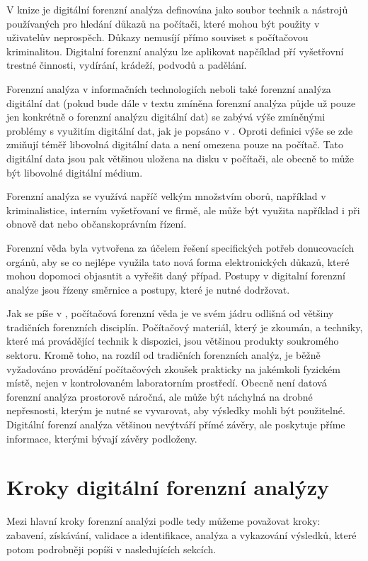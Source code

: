 \documentclass[thesis=B,czech]{FITthesis}[2012/06/26]
\begin{document}
V knize \cite{RECHAndBook} je digitální forenzní analýza definována jako soubor technik a nástrojů používaných pro hledání důkazů na počítači, které mohou být použity v uživatelův neprospěch. Důkazy nemusíjí přímo souviset s počítačovou kriminalitou. Digitalní forenzní analýzu lze aplikovat napčíklad pří vyšetřovní trestné činnosti, vydírání, krádeží, podvodů a padělání.

Forenzní analýza v informačních technologiích neboli také forenzní analýza digitální dat (pokud bude dále v textu zmíněna forenzní analýza půjde už pouze jen konkrétně o forenzní analýzu digitální dat) se zabývá výše zmíněnými problémy s využitím digitální dat, jak je popsáno v \cite{for_root}. Oproti definici výše se zde zmiňují téměř libovolná digitální data a není omezena pouze na počítač. Tato digitální data jsou pak většinou uložena na disku v počítači, ale obecně to může být libovolné digitální médium.

Forenzní analýza se využívá napříč velkým množstvím oborů, například v kriminalistice, interním vyšetřovaní ve firmě, ale může být využita například i při obnově dat nebo občanskoprávním řízení.

Forenzní věda byla vytvořena za účelem řešení specifických potřeb donucovacích orgánů, aby se co nejlépe využila tato nová forma elektronických důkazů, které mohou dopomoci objasntit a vyřešit daný případ. Postupy v digitalní forenzní analýze jsou řízeny směrnice a postupy, které je nutné dodržovat.

Jak se píše v \cite{for_uvod}, počítačová forenzní věda je ve svém jádru odlišná od většiny tradičních forenzních disciplín. Počítačový materiál, který je zkoumán, a techniky, které má provádějící technik k dispozici, jsou většinou produkty soukromého sektoru. Kromě toho, na rozdíl od tradičních forenzních analýz, je běžně vyžadováno provádění počítačových zkoušek prakticky na jakémkoli fyzickém místě, nejen v kontrolovaném laboratorním prostředí. Obecně není datová forenzní analýza prostorově náročná, ale může být náchylná na drobné nepřesnosti, kterým je nutné se vyvarovat, aby výsledky mohli být použitelné. Digitální forenzí analýza většinou nevýtváří přímé závěry, ale poskytuje příme informace, kterými bývají závěry podloženy.


\section{Kroky digitální forenzní analýzy}
Mezi hlavní kroky forenzní analýzi podle \cite{carroll2008computer} tedy můžeme považovat kroky: zabavení, získávání, validace a identifikace, analýza a vykazování výsledků, které potom podrobněji popíši v nasledujících sekcích.
\end{document}
